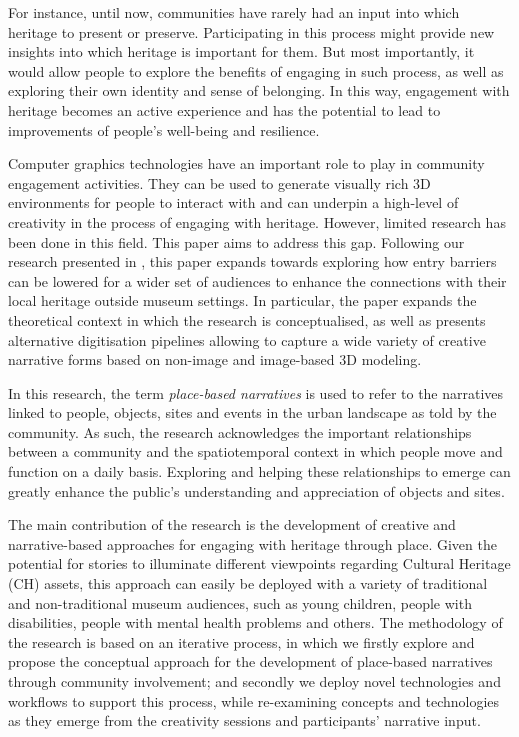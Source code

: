 \documentclass[acmlarge,screen,dvipsnames]{acmart}
\begin{document}
For instance, until now, communities have rarely had an input into which heritage to present or preserve. Participating in this process might provide new insights into which
heritage is important for them. But most importantly, it would allow people to explore the benefits of engaging in such process, as well as exploring their own identity and sense of belonging. In this way, engagement with heritage becomes an active experience and has the potential to lead to improvements of people's well-being and resilience. 


Computer graphics technologies have an important role to play in community engagement activities. They can be used to generate visually rich 3D environments for people to interact with and can underpin a high-level of creativity in the process of engaging with heritage. However, limited research has been done in this field.  This paper aims to address this gap. Following our research presented in \cite{6b8314fd76a64d3f86fd627505cc29e9}, this paper expands towards exploring how entry barriers can be lowered for a wider set of audiences to enhance the connections with their local heritage outside museum
settings. In particular, the paper expands the theoretical context in which the research is conceptualised, as well as presents alternative digitisation pipelines allowing to capture a wide variety of creative narrative forms based on non-image and image-based 3D modeling. 

In this research, the term \textit{place-based
narratives} is used to refer to the narratives linked to people, objects, sites and events in the urban landscape as told by the community. As such, the research acknowledges the important relationships between a community and the spatiotemporal context in which people move and function on a daily basis. Exploring and helping these relationships to emerge can greatly enhance the public's understanding and appreciation of objects and sites. 

The main contribution of the research is the development of creative and narrative-based
approaches for engaging with heritage through place. Given the potential for stories to illuminate different viewpoints regarding Cultural Heritage (CH) assets, this approach can easily be deployed with a variety of traditional and non-traditional museum audiences, such as young children, people with disabilities, people with mental health problems and others. The methodology of the research is based on an iterative process, in which we firstly explore and propose the conceptual approach for
the development of place-based narratives through community involvement; and
secondly we deploy novel technologies and workflows to support this process, while re-examining concepts and technologies as they emerge from the creativity sessions and participants' narrative input.
\end{document}
